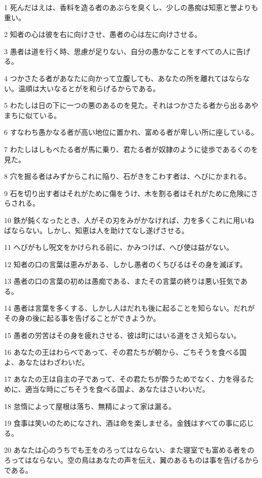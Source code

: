 \par 1 死んだはえは、香料を造る者のあぶらを臭くし、少しの愚痴は知恵と誉よりも重い。
\par 2 知者の心は彼を右に向けさせ、愚者の心は左に向けさせる。
\par 3 愚者は道を行く時、思慮が足りない、自分の愚かなことをすべての人に告げる。
\par 4 つかさたる者があなたに向かって立腹しても、あなたの所を離れてはならない。温順は大いなるとがを和らげるからである。
\par 5 わたしは日の下に一つの悪のあるのを見た。それはつかさたる者から出るあやまちに似ている。
\par 6 すなわち愚かなる者が高い地位に置かれ、富める者が卑しい所に座している。
\par 7 わたしはしもべたる者が馬に乗り、君たる者が奴隷のように徒歩であるくのを見た。
\par 8 穴を掘る者はみずからこれに陥り、石がきをこわす者は、へびにかまれる。
\par 9 石を切り出す者はそれがために傷をうけ、木を割る者はそれがために危険にさらされる。
\par 10 鉄が鈍くなったとき、人がその刃をみがかなければ、力を多くこれに用いねばならない。しかし、知恵は人を助けてなし遂げさせる。
\par 11 へびがもし呪文をかけられる前に、かみつけば、へび使は益がない。
\par 12 知者の口の言葉は恵みがある、しかし愚者のくちびるはその身を滅ぼす。
\par 13 愚者の口の言葉の初めは愚痴である、またその言葉の終りは悪い狂気である。
\par 14 愚者は言葉を多くする、しかし人はだれも後に起ることを知らない。だれがその身の後に起る事を告げることができようか。
\par 15 愚者の労苦はその身を疲れさせる、彼は町にはいる道をさえ知らない。
\par 16 あなたの王はわらべであって、その君たちが朝から、ごちそうを食べる国よ、あなたはわざわいだ。
\par 17 あなたの王は自主の子であって、その君たちが酔うためでなく、力を得るために、適当な時にごちそうを食べる国よ、あなたはさいわいだ。
\par 18 怠惰によって屋根は落ち、無精によって家は漏る。
\par 19 食事は笑いのためになされ、酒は命を楽しませる。金銭はすべての事に応じる。
\par 20 あなたは心のうちでも王をのろってはならない、また寝室でも富める者をのろってはならない。空の鳥はあなたの声を伝え、翼のあるものは事を告げるからである。

